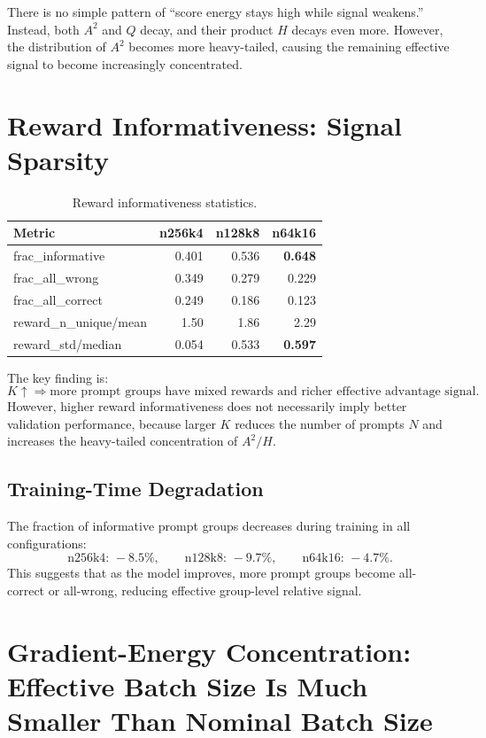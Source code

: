 \documentclass[11pt,a4paper]{article}
\begin{document}
There is no simple pattern of ``score energy stays high while signal weakens.'' Instead, both \(A^2\) and \(Q\) decay, and their product \(H\) decays even more. However, the distribution of \(A^2\) becomes more heavy-tailed, causing the remaining effective signal to become increasingly concentrated.

\section{Reward Informativeness: Signal Sparsity}

\begin{table}[h]
\centering
\begin{tabular}{lrrr}
\toprule
Metric & n256k4 & n128k8 & n64k16\\
\midrule
frac\_informative & 0.401 & 0.536 & \textbf{0.648}\\
frac\_all\_wrong & 0.349 & 0.279 & 0.229\\
frac\_all\_correct & 0.249 & 0.186 & 0.123\\
reward\_n\_unique/mean & 1.50 & 1.86 & 2.29\\
reward\_std/median & 0.054 & 0.533 & \textbf{0.597}\\
\bottomrule
\end{tabular}
\caption{Reward informativeness statistics.}
\end{table}

The key finding is:
\[
\boxed{
K \uparrow \Rightarrow \text{more prompt groups have mixed rewards and richer effective advantage signal.}
}
\]
However, higher reward informativeness does not necessarily imply better validation performance, because larger \(K\) reduces the number of prompts \(N\) and increases the heavy-tailed concentration of \(A^2/H\).

\subsection{Training-Time Degradation}

The fraction of informative prompt groups decreases during training in all configurations:
\[
\text{n256k4: } -8.5\%,\qquad
\text{n128k8: } -9.7\%,\qquad
\text{n64k16: } -4.7\%.
\]
This suggests that as the model improves, more prompt groups become all-correct or all-wrong, reducing effective group-level relative signal.

\section{Gradient-Energy Concentration: Effective Batch Size Is Much Smaller Than Nominal Batch Size}
\end{document}
